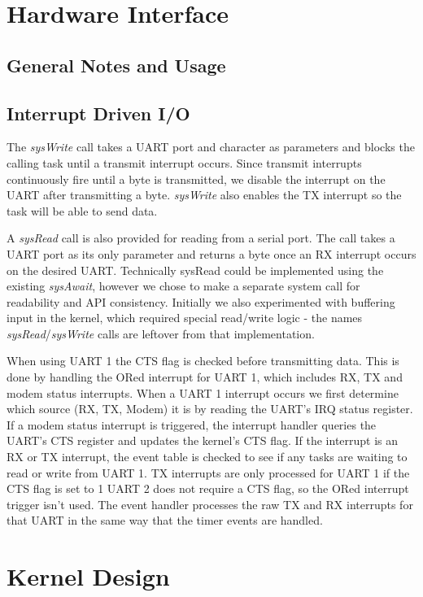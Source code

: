 \documentclass[twoside,a4paper]{refart}
\begin{document}
\section{Hardware Interface}
\subsection{General Notes and Usage}
\subsection{Interrupt Driven I/O}
The \textit{sysWrite} call takes a UART port and character as parameters and blocks the calling task until a transmit interrupt occurs. Since transmit interrupts continuously fire until a byte is transmitted, we disable the interrupt on the UART after transmitting a byte. \textit{sysWrite} also enables the TX interrupt so the task will be able to send data.

A \textit{sysRead} call is also provided for reading from a serial port. The call takes a UART port as its only parameter and returns a byte once an RX interrupt occurs on the desired UART. Technically sysRead could be implemented using the existing \textit{sysAwait}, however we chose to make a separate system call for readability and API consistency. Initially we also experimented with buffering input in the kernel, which required special read/write logic - the names \textit{sysRead}/\textit{sysWrite} calls are leftover from that implementation.

When using UART 1 the CTS flag is checked before transmitting data. This is done by handling the ORed interrupt for UART 1, which includes RX, TX and modem status interrupts. When a UART 1 interrupt occurs we first determine which source (RX, TX, Modem) it is by reading the UART’s IRQ status register. If a modem status interrupt is triggered, the interrupt handler queries the UART’s CTS register and updates the kernel’s CTS flag. If the interrupt is an RX or TX interrupt, the event table is checked to see if any tasks are waiting to read or write from UART 1. TX interrupts are only processed for UART 1 if the CTS flag is set to 1 UART 2 does not require a CTS flag, so the ORed interrupt trigger isn’t used. The event handler processes the raw TX and RX interrupts for that UART in the same way that the timer events are handled.

\section{Kernel Design}
\end{document}

